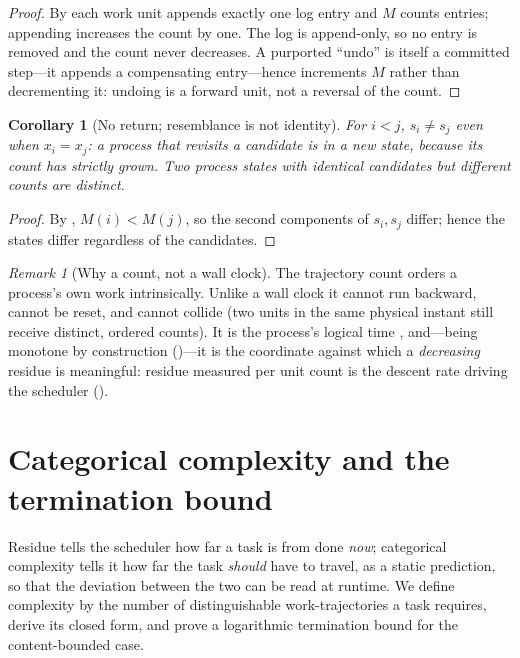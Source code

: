 \documentclass[twocolumn,10pt,a4paper]{article}
\theoremstyle{thmstyle}
\newtheorem{corollary}[theorem]{Corollary}
\theoremstyle{definition}
\theoremstyle{remark}
\newtheorem{remark}[theorem]{Remark}
\newcommand{\Mcount}{M}
\begin{document}
\begin{proof}
By  each work unit appends exactly one log entry and
$\Mcount$ counts entries; appending increases the count by one. The log
is append-only, so no entry is removed and the count never decreases. A
purported ``undo'' is itself a committed step---it appends a
compensating entry---hence increments $\Mcount$ rather than decrementing
it: undoing is a forward unit, not a reversal of the count.
\end{proof}

\begin{corollary}[No return; resemblance is not identity]
\label{cor:noreturn}
For $i<j$, $s_i\neq s_j$ even when $x_i=x_j$: a process that revisits a
candidate is in a new state, because its count has strictly grown. Two
process states with identical candidates but different counts are
distinct.
\end{corollary}

\begin{proof}
By , $\Mcount(i)<\Mcount(j)$, so the second components
of $s_i,s_j$ differ; hence the states differ regardless of the
candidates.
\end{proof}

\begin{remark}[Why a count, not a wall clock]
\label{rem:why-count}
The trajectory count orders a process's own work intrinsically. Unlike a
wall clock it cannot run backward, cannot be reset, and cannot collide
(two units in the same physical instant still receive distinct, ordered
counts). It is the process's logical time
\citep{lamport1978,fidge1988,mattern1989}, and---being monotone by
construction ()---it is the coordinate against which a
\emph{decreasing} residue is meaningful: residue measured per unit count
is the descent rate driving the scheduler ().
\end{remark}

\section{Categorical complexity and the termination bound}
\label{sec:complexity}

Residue tells the scheduler how far a task is from done \emph{now};
categorical complexity tells it how far the task \emph{should} have to
travel, as a static prediction, so that the deviation between the two can
be read at runtime. We define complexity by the number of distinguishable
work-trajectories a task requires, derive its closed form, and prove a
logarithmic termination bound for the content-bounded case.
\end{document}
